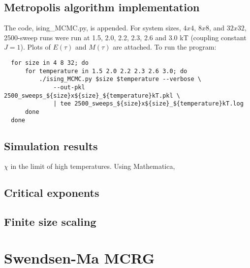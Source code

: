 \documentclass[11pt, letterpaper]{scrartcl} %
\numberwithin{equation}{section} %
\numberwithin{figure}{section} %
\numberwithin{table}{section} %
\begin{document}
\subsection{Metropolis algorithm implementation}

The code, ising\_MCMC.py, is appended. For system sizes, $4x4$, $8x8$,
and $32x32$, 2500-sweep runs were run at 1.5, 2.0, 2.2, 2.3, 2.6 and
3.0 kT (coupling constant $J=1$). Plots of $E(\tau)$ and $M(\tau)$ are
attached. To run the program:

\begin{lstlisting}
  for size in 4 8 32; do
      for temperature in 1.5 2.0 2.2 2.3 2.6 3.0; do
          ./ising_MCMC.py $size $temperature --verbose \
              --out-pkl 2500_sweeps_${size}x${size}_${temperature}kT.pkl \
              | tee 2500_sweeps_${size}x${size}_${temperature}kT.log
      done
  done
\end{lstlisting}


\subsection{Simulation results}

$\chi$ in the limit of high temperatures. Using Mathematica,


\subsection{Critical exponents}


\subsection{Finite size scaling}


\section{Swendsen-Ma MCRG}


\end{document}

